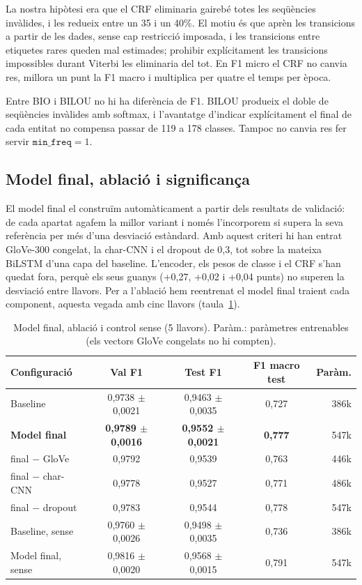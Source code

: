 La nostra hipòtesi era que el CRF eliminaria gairebé totes les seqüències invàlides, i les redueix entre un 35 i un
40\%. El motiu és que aprèn les transicions a partir de les dades, sense cap restricció imposada, i les transicions
entre etiquetes rares queden mal estimades; prohibir explícitament les transicions impossibles durant Viterbi les
eliminaria del tot. En F1 micro el CRF no canvia res, millora un punt la F1 macro i multiplica per quatre el temps
per època.

Entre BIO i BILOU no hi ha diferència de F1. BILOU produeix el doble de seqüències invàlides amb softmax, i
l'avantatge d'indicar explícitament el final de cada entitat no compensa passar de 119 a 178 classes. Tampoc no
canvia res fer servir $\texttt{min\_freq}=1$.

\subsection{Model final, ablació i significança}
\label{sec:final}

El model final el construïm automàticament a partir dels resultats de validació: de cada apartat agafem la millor
variant i només l'incorporem si supera la seva referència per més d'una desviació estàndard. Amb aquest criteri hi
han entrat GloVe-300 congelat, la char-CNN i el dropout de 0,3, tot sobre la mateixa BiLSTM d'una capa del
baseline. L'encoder, els pesos de classe i el CRF s'han quedat fora, perquè els seus guanys (+0,27, +0,02 i +0,04
punts) no superen la desviació entre llavors. Per a l'ablació hem reentrenat el model final traient cada component,
aquesta vegada amb cinc llavors (taula~\ref{tab:final}).

\begin{table}[ht]
\centering\small
\caption{Model final, ablació i control sense \mindelta{} (5 llavors). Paràm.: paràmetres entrenables (els
vectors GloVe congelats no hi compten).}
\label{tab:final}
\begin{tabular}{lcccr}
\toprule
Configuració & Val F1 & Test F1 & F1 macro test & Paràm. \\
\midrule
Baseline        & 0,9738 $\pm$ 0,0021 & 0,9463 $\pm$ 0,0035 & 0,727 & 386k \\
\textbf{Model final} & \textbf{0,9789 $\pm$ 0,0016} & \textbf{0,9552 $\pm$ 0,0021} & \textbf{0,777} & 547k \\
final $-$ GloVe    & 0,9792 & 0,9539 & 0,763 & 446k \\
final $-$ char-CNN & 0,9778 & 0,9527 & 0,771 & 486k \\
final $-$ dropout  & 0,9783 & 0,9544 & 0,778 & 547k \\
\midrule
Baseline, sense \mindelta{}    & 0,9760 $\pm$ 0,0026 & 0,9498 $\pm$ 0,0035 & 0,736 & 386k \\
Model final, sense \mindelta{} & 0,9816 $\pm$ 0,0020 & 0,9568 $\pm$ 0,0015 & 0,791 & 547k \\
\bottomrule
\end{tabular}
\end{table}

